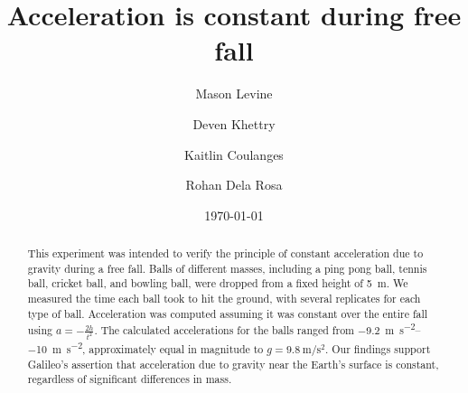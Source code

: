 \documentclass[reprint,amsmath,amssymb,aps,twoside]{revtex4-2}
\begin{document}
\setcounter{page}{41}

\title{Acceleration is constant during free fall}
\author{Mason Levine}
\author{Deven Khettry}
\author{Kaitlin Coulanges}
\author{Rohan Dela Rosa}
\date{\today}

\begin{abstract}
This experiment was intended to verify the principle of constant acceleration due to gravity during a free fall. Balls of different masses, including a ping pong ball, tennis ball, cricket ball, and bowling ball, were dropped from a fixed height of \qty{5}{\meter}. We measured the time each ball took to hit the ground, with several replicates for each type of ball. Acceleration was computed assuming it was constant over the entire fall using $a=-\frac{2h}{t^2}$. The calculated accelerations for the balls ranged from \qtyrange{-9.2}{-10}{\meter\per\second\squared}, approximately equal in magnitude to $g=\qty{9.8}{\meter\per\second\squared}$. Our findings support Galileo's assertion that acceleration due to gravity near the Earth's surface is constant, regardless of significant differences in mass.
\end{abstract}


\maketitle\thispagestyle{mytitlepage}
\end{document}
